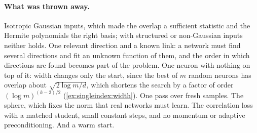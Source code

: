 \begin{refsection}
\paragraph{What was thrown away.}
Isotropic Gaussian inputs, which made the overlap a sufficient statistic and the Hermite polynomials the right basis; with structured or non-Gaussian inputs neither holds. One relevant direction and a known link: a network must find several directions and fit an unknown function of them, and the order in which directions are found becomes part of the problem. One neuron with nothing on top of it: width changes only the start, since the best of $m$ random neurons has overlap about $\sqrt{2\log m/d}$, which shortens the search by a factor of order $(\log m)^{(k-2)/2}$ (\cref{ex:singleindex:width}). One pass over fresh samples. The sphere, which fixes the norm that real networks must learn. The correlation loss with a matched student, small constant steps, and no momentum or adaptive preconditioning. And a warm start.


\end{refsection}
